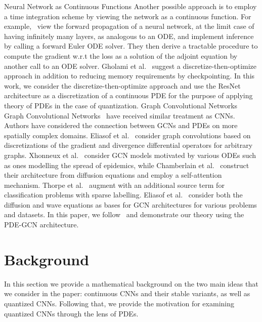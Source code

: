 \documentclass[reqno]{amsart}
\makeatletter
\def\paragraph{\@startsection{paragraph}{4}%
  \z@\z@{-\fontdimen2\font}%
  {\normalfont\bfseries}}
\makeatother
\begin{document}
\paragraph{Neural Network as Continuous Functions}
Another possible approach is to employ a time integration scheme by viewing the network as a continuous function. For example,~\cite{chen2018neural} view the forward propagation of a neural network, at the limit case of having infinitely many layers, as analogous to an ODE, and implement inference by calling a forward Euler ODE solver. They then derive a tractable procedure to compute the gradient w.r.t the loss as a solution of the adjoint equation by another call to an ODE solver. Gholami et al.~\cite{Gholami2019ANODEUA} suggest a discretize-then-optimize approach in addition to reducing memory requirements by checkpointing. In this work, we consider the discretize-then-optimize approach and use the ResNet architecture as a discretization of a continuous PDE for the purpose of applying theory of PDEs in the case of quantization.
\bigskip
\paragraph{Graph Convolutional Networks}
Graph Convolutional Networks~\cite{kipf2016semi,chen2020simple} have received similar treatment as CNNs. Authors have considered the connection between GCNs and PDEs on more spatially complex domains. Eliasof et al.~\cite{eliasof2020diffgcn} consider graph convolutions based on discretizations of the gradient and divergence differential operators for arbitrary graphs. Xhonneux et al.~\cite{xhonneux2020contgnn} consider GCN models motivated by various ODEs such as ones modelling the spread of epidemics, while Chamberlain et al.~\cite{chamberlain2021grand} construct their architecture from diffusion equations and employ a self-attention mechanism. Thorpe et al.~\cite{thorpe2022grandplusplus} augment \cite{chamberlain2021grand} with an additional source term for classification problems with sparse labelling.
Eliasof et al.~\cite{eliasof2021pdegcn} consider both the diffusion and wave equations as bases for GCN architectures for various problems and datasets. In this paper, we follow~\cite{eliasof2021pdegcn} and demonstrate our theory using the PDE-GCN architecture.

\section{Background}
\label{sec:background}
In this section we provide a mathematical background on the two main ideas that we consider in the paper: continuous CNNs and their stable variants, as well as quantized CNNs. Following that, we provide the motivation for examining quantized CNNs through the lens of PDEs.  
\end{document}
